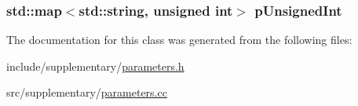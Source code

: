 \subsubsection[{p\-Unsigned\-Int}]{\setlength{\rightskip}{0pt plus 5cm}std\-::map$<$std\-::string, unsigned int$>$ p\-Unsigned\-Int\hspace{0.3cm}{\ttfamily [private]}}\label{classparameters_class_a997bcb31fee3242f776c7e05d709ce12}


The documentation for this class was generated from the following files\-:\begin{DoxyCompactItemize}
\item 
include/supplementary/\hyperlink{parameters_8h}{parameters.\-h}\item 
src/supplementary/\hyperlink{parameters_8cc}{parameters.\-cc}\end{DoxyCompactItemize}
